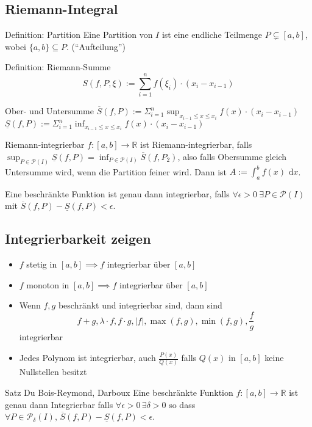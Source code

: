 \documentclass[a4paper,10pt]{article}
\def\R{\mathbb{R}}
\def\dx{\text{ d}x}
\begin{document}
\subsection{Riemann-Integral}
\begin{subbox}{Definition: Partition}
 Eine Partition von $I$ ist eine endliche Teilmenge $P \subsetneq [a,b]$, wobei $\{a,b\} \subseteq P$. (``Aufteilung'')
\end{subbox}
\begin{mainbox}{Definition: Riemann-Summe}
 $$S(f, P, \xi) := \sum_{i=1}^n f(\xi_i) \cdot (x_i - x_{i-1})$$
\end{mainbox}
\begin{subbox}{Ober- und Untersumme}
 $\overline{S}(f,P) := \Sigma_{i=1}^{n} \sup_{x_{i-1} \leq x \leq x_i} f(x) \cdot (x_i - x_{i-1})$ \\
 $\underline{S}(f,P) := \Sigma_{i=1}^{n} \inf_{x_{i-1} \leq x \leq x_i} f(x) \cdot (x_i - x_{i-1})$
\end{subbox}
\begin{mainbox}{Riemann-integrierbar}
 $f:[a,b] \to \R$ ist Riemann-integrierbar, falls $\sup_{P \in \mathcal{P}(I)} \underline{S}(f,P) = \inf_{P \in \mathcal{P}(I)}\overline{S}(f, P_2)$, also falls Obersumme gleich Untersumme wird, wenn die Partition feiner wird. Dann ist $A := \int_a^b f(x)\dx$.
\end{mainbox}

Eine beschränkte Funktion ist genau dann integrierbar, falls $\forall \epsilon > 0 \ \exists P \in \mathcal{P}(I)$ mit $\overline{S}(f, P) - \underline{S}(f, P) < \epsilon$.

\subsection{Integrierbarkeit zeigen}
\begin{itemize}
 \item $f$ stetig in $[a,b] \implies f$ integrierbar über $[a,b]$
 \item $f$ monoton in $[a,b] \implies f$ integrierbar über $[a,b]$
 \item Wenn $f,g$ beschränkt und integrierbar sind, dann sind
 $$f+g, \lambda \cdot f, f \cdot g, |f|, \max(f,g), \min(f,g), \frac{f}{g}$$ integrierbar
 \item Jedes Polynom ist integrierbar, auch $\frac{P(x)}{Q(x)}$ falls $Q(x)$ in $[a,b]$ keine Nullstellen besitzt
\end{itemize}

\begin{mainbox}{Satz Du Bois-Reymond, Darboux}
  Eine beschränkte Funktion $f: [a,b] \to \R$ ist genau dann Integrierbar falls $\forall \epsilon > 0 \, \exists \delta > 0$ so dass\\
  $\forall P \in \mathcal{P}_\delta(I), \, \overline{S}(f,P) - \underline{S}(f, P) < \epsilon$.
\end{mainbox}
\end{document}
